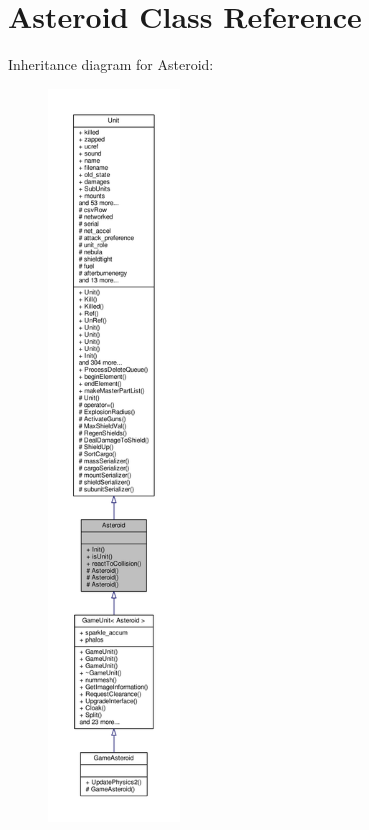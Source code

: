 \hypertarget{classAsteroid}{}\section{Asteroid Class Reference}
\label{classAsteroid}


Inheritance diagram for Asteroid\+:
\nopagebreak
\begin{figure}[H]
\begin{center}
\leavevmode
\includegraphics[height=550pt]{dd/dc6/classAsteroid__inherit__graph}
\end{center}
\end{figure}


